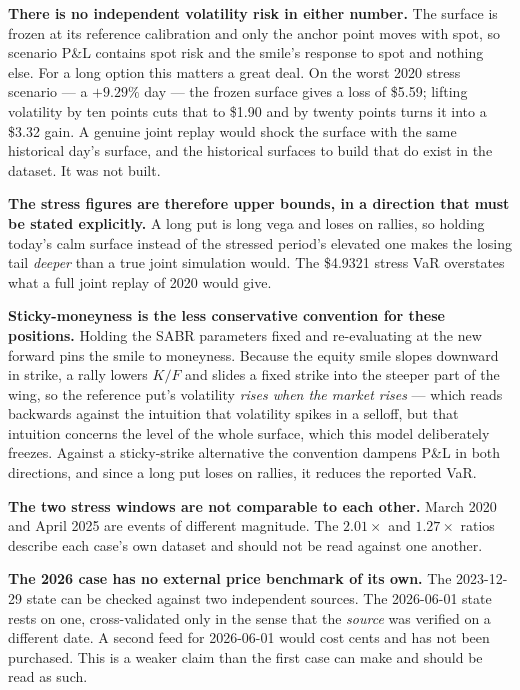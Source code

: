 \documentclass[11pt]{article}
\begin{document}
\textbf{There is no independent volatility risk in either number.} The surface is frozen
at its reference calibration and only the anchor point moves with spot, so scenario P\&L
contains spot risk and the smile's response to spot and nothing else. For a long option
this matters a great deal. On the worst 2020 stress scenario --- a $+9.29\%$ day --- the
frozen surface gives a loss of \$5.59; lifting volatility by ten points cuts that to
\$1.90 and by twenty points turns it into a \$3.32 gain. A genuine joint replay would
shock the surface with the same historical day's surface, and the historical surfaces to
build that do exist in the dataset. It was not built.

\textbf{The stress figures are therefore upper bounds, in a direction that must be stated
explicitly.} A long put is long vega and loses on rallies, so holding today's calm
surface instead of the stressed period's elevated one makes the losing tail
\emph{deeper} than a true joint simulation would. The \$4.9321 stress VaR overstates
what a full joint replay of 2020 would give.

\textbf{Sticky-moneyness is the less conservative convention for these positions.}
Holding the SABR parameters fixed and re-evaluating at the new forward pins the smile to
moneyness. Because the equity smile slopes downward in strike, a rally lowers $K/F$ and
slides a fixed strike into the steeper part of the wing, so the reference put's
volatility \emph{rises when the market rises} --- which reads backwards against the
intuition that volatility spikes in a selloff, but that intuition concerns the level of
the whole surface, which this model deliberately freezes. Against a sticky-strike
alternative the convention dampens P\&L in both directions, and since a long put loses on
rallies, it reduces the reported VaR.

\textbf{The two stress windows are not comparable to each other.} March 2020 and April
2025 are events of different magnitude. The $2.01\times$ and $1.27\times$ ratios describe
each case's own dataset and should not be read against one another.

\textbf{The 2026 case has no external price benchmark of its own.} The 2023-12-29 state
can be checked against two independent sources. The 2026-06-01 state rests on one,
cross-validated only in the sense that the \emph{source} was verified on a different
date. A second feed for 2026-06-01 would cost cents and has not been purchased. This is
a weaker claim than the first case can make and should be read as such.
\end{document}
